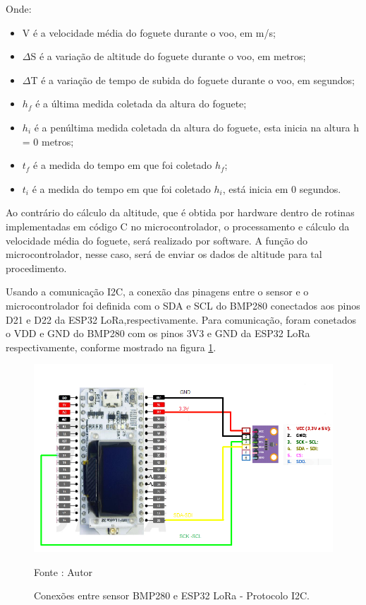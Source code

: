 \par Onde:

\begin{itemize}
    \item V é a velocidade média do foguete durante o voo, em m/s;
	\item $\Delta$S é a variação de altitude do foguete durante o voo, em metros;
	\item $\Delta$T é a variação de tempo de subida do foguete durante o voo, em segundos;
	\item $h_{f}$ é a última medida coletada da altura do foguete;
	\item $h_{i}$ é a penúltima medida coletada da altura do foguete, esta inicia na altura h = 0 metros;
	\item $t_{f}$ é a medida do tempo em que foi coletado $h_{f}$;
	\item $t_{i}$ é a medida do tempo em que foi coletado $h_{i}$, está inicia em 0 segundos.
\end{itemize}

\par Ao contrário do cálculo da altitude, que é obtida por hardware dentro de rotinas implementadas em código C no microcontrolador, o processamento e cálculo da velocidade média do foguete, será realizado por software. A função do microcontrolador, nesse caso, será de enviar os dados de altitude para tal procedimento. 

\par Usando a comunicação I2C, a conexão das pinagens entre o sensor e o microcontrolador foi definida com o SDA e SCL do BMP280 conectados aos pinos D21 e D22 da ESP32 LoRa,respectivamente. Para comunicação, foram conetados o VDD e GND do BMP280 com os pinos 3V3 e GND da ESP32 LoRa respectivamente, conforme mostrado na figura \ref{fig:PINAGEM_BMP280}. 

\begin{figure}[H]
  \centering
  \includegraphics[scale=0.35]{figuras/PINAGEM_BMP280.png}
  \caption{Conexões entre sensor BMP280 e ESP32 LoRa - Protocolo I2C.} 
  {\footnotesize Fonte : Autor } 
  \label{fig:PINAGEM_BMP280}
\end{figure}

